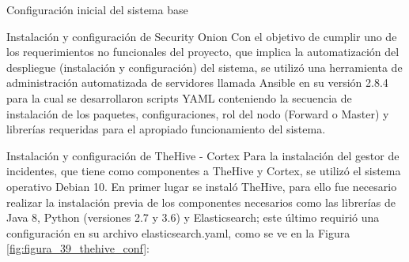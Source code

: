\begin{section}{Configuración inicial del sistema base}
\begin{subsection}{Instalación y configuración de Security Onion}
        Con el objetivo de cumplir uno de los requerimientos no funcionales del proyecto, que implica la automatización del despliegue (instalación y configuración) del sistema, se utilizó una herramienta de administración automatizada de servidores llamada Ansible en su versión 2.8.4 para la cual se desarrollaron scripts YAML conteniendo la secuencia de instalación de los paquetes, configuraciones, rol del nodo (Forward o Master) y librerías requeridas para el apropiado funcionamiento del sistema.\par
        \end{subsection}
        
        \begin{subsection}{Instalación y configuración de TheHive - Cortex}
        Para la instalación del gestor de incidentes, que tiene como componentes a  TheHive y Cortex, se utilizó  el sistema operativo Debian 10. En primer lugar se instaló TheHive, para ello fue necesario realizar la instalación previa de los componentes necesarios como las librerías de Java 8, Python (versiones 2.7 y 3.6) y Elasticsearch; este último requirió una configuración en su archivo elasticsearch.yaml, como se ve en la Figura \ref{fig:figura_39_thehive_conf}:
        

\end{subsection}
\end{section}
